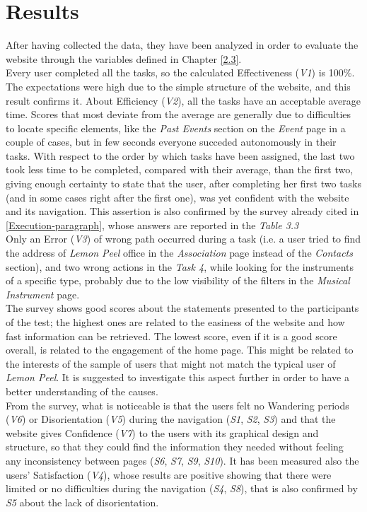 \documentclass[../../UsabilityReport.tex]{subfiles}
\begin{document}
\section{Results}
	After having collected the data, they have been analyzed in order to evaluate the website through the variables defined in Chapter \ref{2.3}. \\
	
	Every user completed all the tasks, so the calculated Effectiveness (\textit{V1}) is 100\%. The expectations were high due to the simple structure of the website, and this result confirms it. About Efficiency (\textit{V2}), all the tasks have an acceptable average time. Scores that most deviate from the average are generally due to difficulties to locate specific elements, like the \textit{Past Events} section on the \textit{Event} page in a couple of cases, but in few seconds everyone succeded autonomously in their tasks. With respect to the order by which tasks have been assigned, the last two took less time to be completed, compared with their average, than the first two, giving enough certainty to state that the user, after completing her first two tasks (and in some cases right after the first one), was yet confident with the website and its navigation. This assertion is also confirmed by the survey already cited in \ref{Execution-paragraph}, whose answers are reported in the \textit{Table 3.3}\\
	Only an Error (\textit{V3}) of wrong path occurred during a task (i.e. a user tried to find the address of \textit{Lemon Peel} office in the \textit{Association} page instead of the \textit{Contacts} section), and two wrong actions in the \textit{Task 4}, while looking for the instruments of a specific type, probably due to the low visibility of the filters in the \textit{Musical Instrument} page. \\
	
	The survey shows good scores about the statements presented to the participants of the test; the highest ones are related to the easiness of the website and how fast information can be retrieved. The lowest score, even if it is a good score overall, is related to the engagement of the home page. This might be related to the interests of the sample of users that might not match the typical user of \textit{Lemon Peel}. It is suggested to investigate this aspect further in order to have a better understanding of the causes. \\
	From the survey, what is noticeable is that the users felt no Wandering periods (\textit{V6}) or Disorientation (\textit{V5}) during the navigation (\textit{S1}, \textit{S2}, \textit{S3}) and that the website gives Confidence (\textit{V7}) to the users with its graphical design and structure, so that they could find the information they needed without feeling any inconsistency between pages (\textit{S6}, \textit{S7}, \textit{S9}, \textit{S10}). It has been measured also the users' Satisfaction (\textit{V4}), whose results are positive showing that there were limited or no difficulties during the navigation (\textit{S4}, \textit{S8}), that is also confirmed by \textit{S5} about the lack of disorientation.
	
\end{document}
